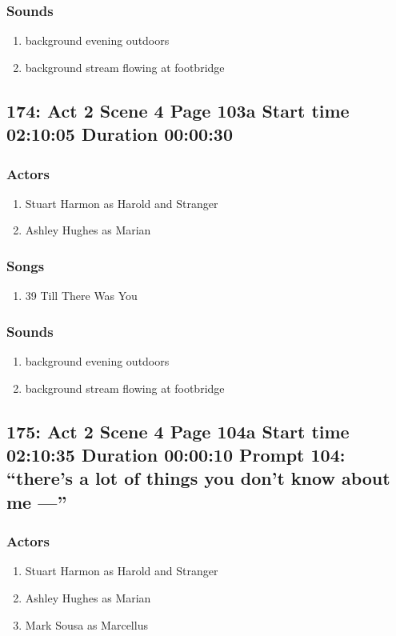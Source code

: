 \subsubsection{Sounds}
\begin{enumerate}
\item background evening outdoors
\item background stream flowing at footbridge
\end{enumerate}
\subsection{174: Act 2 Scene 4 Page 103a Start time 02:10:05 Duration 00:00:30}

\subsubsection{Actors}
\begin{enumerate}
\item Stuart Harmon as Harold and Stranger
\item Ashley Hughes as Marian
\end{enumerate}

\subsubsection{Songs}
\begin{enumerate}
\item 39 Till There Was You
\end{enumerate}\subsubsection{Sounds}
\begin{enumerate}
\item background evening outdoors
\item background stream flowing at footbridge
\end{enumerate}
\subsection{175: Act 2 Scene 4 Page 104a Start time 02:10:35 Duration 00:00:10 Prompt 104: ``there's a lot of things you don't know about me ---''}

\subsubsection{Actors}
\begin{enumerate}
\item Stuart Harmon as Harold and Stranger
\item Ashley Hughes as Marian
\item Mark Sousa as Marcellus
\end{enumerate}

